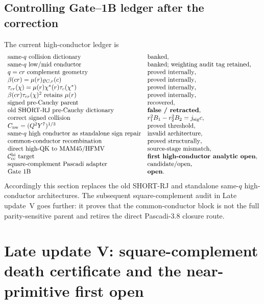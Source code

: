 \documentclass[11pt]{article}
\theoremstyle{definition}
\newcommand{\1}{\mathbf 1}
\begin{document}
\subsection{Controlling Gate--1B ledger after the correction}

The current high-conductor ledger is
\[
\begin{array}{ll}
\text{same-$q$ collision dictionary} & \text{banked},\\
\text{same-$q$ low/mid conductor} & \text{banked; weighting audit tag retained},\\
q=cr\text{ complement geometry} & \text{proved internally},\\
\beta(cr)=\mu(r)\varrho_{C,r}(c) & \text{proved internally},\\
\tau_{cr}(\chi)=\mu(r)\chi^*(r)\tau_c(\chi^*) & \text{proved internally},\\
\beta(cr)\tau_{cr}(\chi)^2\text{ retains }\mu(r) & \text{proved internally},\\
\text{signed pre-Cauchy parent} & \text{recovered},\\
\text{old SHORT-RJ pre-Cauchy dictionary} & \textbf{false / retracted},\\
\text{correct signed collision} & r_1^2B_1-r_2^2B_2=j_{\rm sig}c,\\
C_{\rm nw}=(Q^2Y^7)^{1/3} & \text{proved threshold},\\
\text{same-$q$ high conductor as standalone sign repair} & \text{invalid architecture},\\
\text{common-conductor recombination} & \text{proved structurally},\\
\text{direct high-QK to MAM45/HFMV} & \text{source-stage mismatch},\\
\mathcal C_{\rm cc}^{\rm hi}\text{ target} & \textbf{first high-conductor analytic open},\\
\text{square-complement Pascadi adapter} & \text{candidate/open},\\
\text{Gate 1B} & \textbf{open}.
\end{array}
\]
Accordingly this section replaces the old SHORT-RJ and standalone same-$q$
high-conductor architectures.  The subsequent square-complement audit in
Late update~V goes further: it proves that the common-conductor block is not
the full parity-sensitive parent and retires the direct Pascadi-3.8 closure
route.

\section{Late update V: square-complement death certificate and the near-primitive first open}
\label{app:hicond-nearprim}
\end{document}
